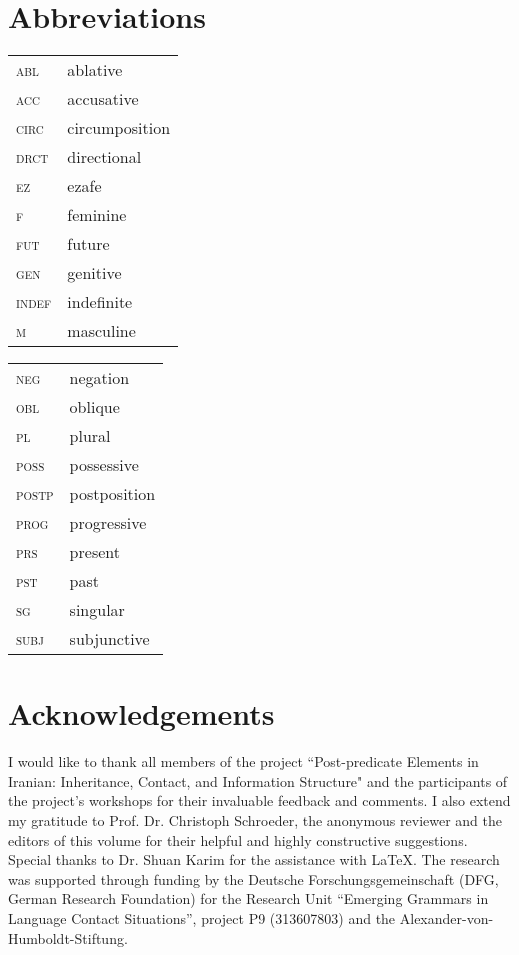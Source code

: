 \documentclass[output=paper,colorlinks,citecolor=brown]{langscibook}
\begin{document}
\section*{Abbreviations}
\begin{tabularx}{.45\textwidth}{lQ}
\textsc{abl} & {ablative} \\
\textsc{acc} & {accusative} \\
\textsc{circ} & circumposition \\
\textsc{drct} & directional \\
\textsc{ez} & ezafe \\
\textsc{f} & feminine \\
\textsc{fut} & future \\
\textsc{gen} & genitive \\
\textsc{indef} & indefinite \\
\textsc{m} & masculine \\
\end{tabularx}
\begin{tabularx}{.45\textwidth}{lQ}
\textsc{neg} & negation \\
\textsc{obl} & {oblique} \\
\textsc{pl} & plural \\
\textsc{poss} & {possessive} \\
\textsc{postp} & postposition \\
\textsc{prog} & progressive \\
\textsc{prs} & present \\
\textsc{pst} & past \\
\textsc{sg} & singular \\
\textsc{subj} & subjunctive \\
\end{tabularx}

\section*{Acknowledgements}

I would like to thank all members of the project ``Post-predicate Elements in Iranian: Inheritance, Contact, and Information Structure" and the participants of the project's workshops for their invaluable feedback and comments. I also extend my gratitude to Prof. Dr. Christoph Schroeder, the anonymous reviewer and the editors of this volume for their helpful and highly constructive suggestions. Special thanks to Dr. Shuan Karim for the assistance with LaTeX. The research was supported through funding by the Deutsche Forschungsgemeinschaft (DFG, German Research Foundation) for the Research Unit “Emerging Grammars in Language Contact Situations”, project P9 (313607803) and the Alexander-von-Humboldt-Stiftung.
\end{document}
